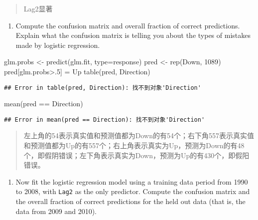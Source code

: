 \documentclass[
]{article}
\newenvironment{Shaded}{\begin{snugshade}}{\end{snugshade}}
\newcommand{\AttributeTok}[1]{\textcolor[rgb]{0.77,0.63,0.00}{#1}}
\newcommand{\DecValTok}[1]{\textcolor[rgb]{0.00,0.00,0.81}{#1}}
\newcommand{\FunctionTok}[1]{\textcolor[rgb]{0.00,0.00,0.00}{#1}}
\newcommand{\NormalTok}[1]{#1}
\newcommand{\OtherTok}[1]{\textcolor[rgb]{0.56,0.35,0.01}{#1}}
\newcommand{\SpecialCharTok}[1]{\textcolor[rgb]{0.00,0.00,0.00}{#1}}
\newcommand{\StringTok}[1]{\textcolor[rgb]{0.31,0.60,0.02}{#1}}
\providecommand{\tightlist}{%
  \setlength{\itemsep}{0pt}\setlength{\parskip}{0pt}}
\begin{document}
\begin{quote}
Lag2显著
\end{quote}

\begin{enumerate}
\def\labelenumi{\arabic{enumi}.}
\setcounter{enumi}{2}
\tightlist
\item
  Compute the confusion matrix and overall fraction of correct
  predictions. Explain what the confusion matrix is telling you about
  the types of mistakes made by logistic regression.
\end{enumerate}

\begin{Shaded}
\begin{Highlighting}[]
\NormalTok{glm.probs }\OtherTok{\textless{}{-}} \FunctionTok{predict}\NormalTok{(glm.fit, }\AttributeTok{type=}\StringTok{\textquotesingle{}response\textquotesingle{}}\NormalTok{)}
\NormalTok{pred }\OtherTok{\textless{}{-}} \FunctionTok{rep}\NormalTok{(}\StringTok{\textquotesingle{}Down\textquotesingle{}}\NormalTok{, }\DecValTok{1089}\NormalTok{)}
\NormalTok{pred[glm.probs}\SpecialCharTok{\textgreater{}}\NormalTok{.}\DecValTok{5}\NormalTok{] }\OtherTok{=} \StringTok{\textquotesingle{}Up\textquotesingle{}}
\FunctionTok{table}\NormalTok{(pred, Direction)}
\end{Highlighting}
\end{Shaded}

\begin{verbatim}
## Error in table(pred, Direction): 找不到对象'Direction'
\end{verbatim}

\begin{Shaded}
\begin{Highlighting}[]
\FunctionTok{mean}\NormalTok{(pred }\SpecialCharTok{==}\NormalTok{ Direction)}
\end{Highlighting}
\end{Shaded}

\begin{verbatim}
## Error in mean(pred == Direction): 找不到对象'Direction'
\end{verbatim}

\begin{quote}
左上角的54表示真实值和预测值都为Down的有54个；右下角557表示真实值和预测值都为Up的有557个；右上角表示真实为Up，预测为Down的有48个，即假阴错误；左下角表示真实为Down，预测为Up的有430个，即假阳错误。
\end{quote}

\begin{enumerate}
\def\labelenumi{\arabic{enumi}.}
\setcounter{enumi}{3}
\tightlist
\item
  Now fit the logistic regression model using a training data period
  from 1990 to 2008, with \texttt{Lag2} as the only predictor. Compute
  the confusion matrix and the overall fraction of correct predictions
  for the held out data (that is, the data from 2009 and 2010).
\end{enumerate}
\end{document}
